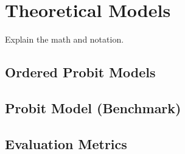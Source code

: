 \chapter{Theoretical Models}\label{chap:model}
Explain the math and notation.



\section{Ordered Probit Models}


\section{Probit Model (Benchmark)}



\section{Evaluation Metrics}
